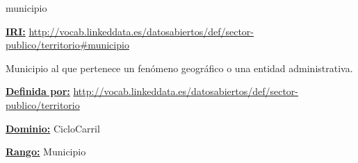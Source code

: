 \begin{mybox}{municipio}
\begin{flushleft}
\underline{\textbf{IRI:}}
\url{http://vocab.linkeddata.es/datosabiertos/def/sector-publico/territorio#municipio}
\newline

Municipio al que pertenece un fenómeno geográfico o una entidad administrativa.
\newline

\underline{\textbf{Definida por:}}
\url{http://vocab.linkeddata.es/datosabiertos/def/sector-publico/territorio}
\newline

\underline{\textbf{Dominio:}}
		CicloCarril
\newline

\underline{\textbf{Rango:}}
		Municipio

\end{flushleft}
\end{mybox}


















